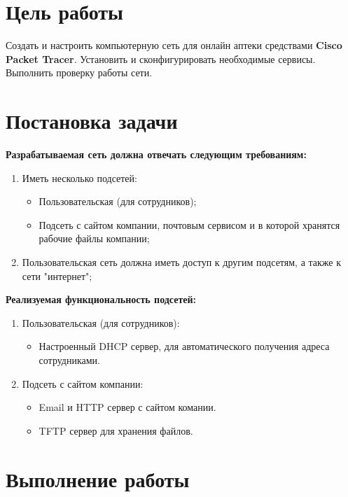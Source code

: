 \documentclass[14pt,a4paper,report]{report}
\begin{document}
\section{Цель работы}
Создать и настроить компьютерную сеть для онлайн аптеки средствами \textbf{Cisco Packet Tracer}. Установить и сконфигурировать необходимые сервисы. Выполнить проверку работы сети.

\section{Постановка задачи}
\textbf{Разрабатываемая сеть должна отвечать следующим требованиям:}
\begin{enumerate}
\item Иметь несколько подсетей:
\begin{itemize}
\item Пользовательская (для сотрудников);
\item Подсеть с сайтом компании, почтовым сервисом и в которой хранятся рабочие файлы компании;
\end{itemize}
\item Пользовательская сеть должна иметь доступ к другим подсетям, а также к сети "интернет";
\end{enumerate}
\textbf{Реализуемая функциональность подсетей:}
\begin{enumerate}
\item Пользовательская (для сотрудников):
\begin{itemize}
\item Настроенный DHCP сервер, для автоматического получения адреса сотрудниками.
\end{itemize}
\item Подсеть с сайтом компании:
\begin{itemize}
\item Email и HTTP сервер с сайтом комании.
\item TFTP сервер для хранения файлов.

\end{itemize}


\end{enumerate}


\section{Выполнение работы}
\end{document}

